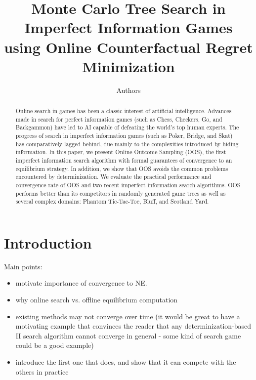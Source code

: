 \documentclass[letterpaper]{article}
\begin{document}
%
\title{Monte Carlo Tree Search in Imperfect Information Games\\using Online Counterfactual Regret Minimization}
\author{Authors}

\newcommand{\vlnote}[1]{{\scriptsize \color{blue} \refstepcounter{vlNoteCounter}\textsf{[VL]$_{\arabic{vlNoteCounter}}$:{#1}}}}

\maketitle

\begin{abstract}
Online search in games has been a classic interest of artificial intelligence.
Advances made in search for perfect information games (such as Chess, Checkers, Go, and Backgammon) have led to AI capable of defeating the world's top human experts. 
The progress of search in imperfect information games (such as Poker, Bridge, and Skat) has comparatively lagged behind, due mainly to the complexities introduced by hiding information. 
In this paper, we present Online Outcome Sampling (OOS), the first imperfect information search algorithm with formal guarantees of convergence to an equilibrium strategy.   
In addition, we show that OOS avoids the common problems encountered by determinization.
We evaluate the practical performance and convergence rate of OOS and two recent imperfect information search algorithms. OOS performs better than its competitors in randomly generated game trees as well as several complex domains: 
Phantom Tic-Tac-Toe, Bluff, and Scotland Yard.  
\end{abstract}

\section{Introduction}

Main points: 
\begin{itemize}
\item motivate importance of convergence to NE. 
\item why online search vs. offline equilibrium computation
\item existing methods may not converge over time (it would be great to have a motivating example that convinces the reader that any determinization-based II search algorithm cannot converge in general - some kind of search game could be a good example)
\item introduce the first one that does, and show that it can compete with the others in practice
\end{itemize}
\end{document}
